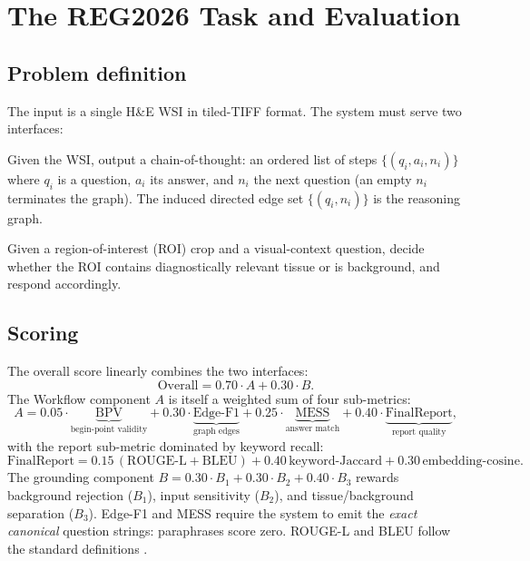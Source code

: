 \documentclass[11pt,a4paper]{article}
\begin{document}
\section{The REG2026 Task and Evaluation}
\label{sec:task}

\subsection{Problem definition}
The input is a single H\&E WSI in tiled-TIFF format. The system must serve two interfaces:

\begin{description}[leftmargin=1.2em,style=nextline]
  \item[Interface A --- Workflow Reasoning.] Given the WSI, output a chain-of-thought: an
        ordered list of steps $\{(q_i, a_i, n_i)\}$ where $q_i$ is a question, $a_i$ its
        answer, and $n_i$ the next question (an empty $n_i$ terminates the graph). The induced
        directed edge set $\{(q_i, n_i)\}$ is the reasoning graph.
  \item[Interface B --- Visual Grounding.] Given a region-of-interest (ROI) crop and a
        visual-context question, decide whether the ROI contains diagnostically relevant
        tissue or is background, and respond accordingly.
\end{description}

\subsection{Scoring}
The overall score linearly combines the two interfaces:
\begin{equation}
\text{Overall} = 0.70\cdot A + 0.30\cdot B .
\end{equation}
The Workflow component $A$ is itself a weighted sum of four sub-metrics:
\begin{equation}
A = 0.05\cdot\underbrace{\text{BPV}}_{\text{begin-point validity}}
  + 0.30\cdot\underbrace{\text{Edge-F1}}_{\text{graph edges}}
  + 0.25\cdot\underbrace{\text{MESS}}_{\text{answer match}}
  + 0.40\cdot\underbrace{\text{FinalReport}}_{\text{report quality}} ,
\end{equation}
with the report sub-metric dominated by keyword recall:
\begin{equation}
\text{FinalReport} = 0.15\,(\text{ROUGE-L}+\text{BLEU})
                   + 0.40\,\text{keyword-Jaccard}
                   + 0.30\,\text{embedding-cosine}.
\end{equation}
The grounding component $B = 0.30\cdot B_1 + 0.30\cdot B_2 + 0.40\cdot B_3$ rewards background
rejection ($B_1$), input sensitivity ($B_2$), and tissue/background separation ($B_3$). Edge-F1
and MESS require the system to emit the \emph{exact canonical} question strings: paraphrases
score zero. ROUGE-L and BLEU follow the standard definitions \cite{lin2004rouge,papineni2002bleu}.
\end{document}
